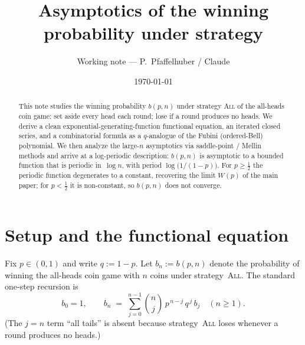\documentclass[11pt]{article}
\title{Asymptotics of the winning probability under strategy \All}
\author{Working note --- P.\ Pfaffelhuber / Claude}
\date{\today}
\theoremstyle{definition}
\newcommand{\All}{\textsc{All}}
\begin{document}
\maketitle

\begin{abstract}
  This note studies the winning probability
  $b(p,n)$ under strategy \All{} of the all-heads coin game: set aside
  every head each round; lose if a round produces no heads. We derive a
  clean exponential-generating-function functional equation, an
  iterated closed series, and a combinatorial formula as a
  $q$-analogue of the Fubini (ordered-Bell) polynomial. We then
  analyze the large-$n$ asymptotics via saddle-point / Mellin methods
  and arrive at a log-periodic description: $b(p,n)$ is asymptotic to
  a bounded function that is periodic in~$\log n$, with period
  $\log\bigl(1/(1-p)\bigr)$. For $p\ge\tfrac12$ the periodic function
  degenerates to a constant, recovering the limit $W(p)$ of the main
  paper; for $p<\tfrac12$ it is non-constant, so $b(p,n)$ does not
  converge.
\end{abstract}

\medskip
\noindent{}
\medskip

\section{Setup and the functional equation}\label{sec:setup}

Fix $p\in(0,1)$ and write $q := 1-p$. Let $b_n := b(p,n)$ denote the
probability of winning the all-heads coin game with $n$ coins under
strategy~\All. The standard one-step recursion is
\begin{equation}\label{eq:brec}
  b_0 = 1, \qquad
  b_n \;=\; \sum_{j=0}^{n-1}\binom{n}{j}\,p^{\,n-j}\,q^{\,j}\,b_j
  \quad(n\ge 1).
\end{equation}
(The $j=n$ term ``all tails'' is absent because strategy~\All{} loses
whenever a round produces no heads.)
\end{document}
